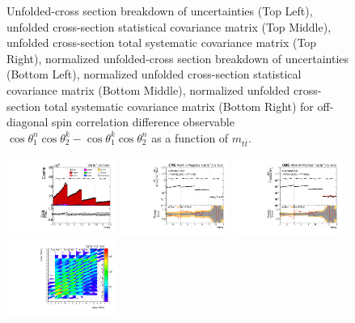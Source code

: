 \begin{figure}[htb]
\begin{center}
\caption{Unfolded-cross section breakdown of uncertainties (Top Left), unfolded cross-section statistical covariance matrix (Top Middle), unfolded cross-section total systematic covariance matrix (Top Right), normalized unfolded-cross section breakdown of uncertainties (Bottom Left), normalized unfolded cross-section statistical covariance matrix (Bottom Middle), normalized unfolded cross-section total systematic covariance matrix (Bottom Right) for off-diagonal spin correlation difference observable $\cos\theta_{1}^{n}\cos\theta_{2}^{k}-\cos\theta_{1}^{k}\cos\theta_{2}^{n}$ as a function of $m_{t\bar{t}}$.}
\label{fig:c_Mnk_mttbar_uncertainties}
\end{center}
\end{figure}
\clearpage
\begin{figure}[htb]
\begin{center}
 \includegraphics[width=0.32\textwidth]{fig_fullRun2UL/controlplots/combined/Hyp_LLBarcHel_vs_TTBarMass.pdf}
 \includegraphics[width=0.32\textwidth]{fig_fullRun2UL/unfolding/combined/UnfoldedResults_ll_cHel_mttbar.pdf}
 \includegraphics[width=0.32\textwidth]{fig_fullRun2UL/unfolding/combined/UnfoldedResultsNorm_ll_cHel_mttbar.pdf} \\
 \includegraphics[width=0.32\textwidth]{fig_fullRun2UL/unfolding/combined/ResponseMatrix_ll_cHel_mttbar.pdf}

\end{center}
\end{figure}
